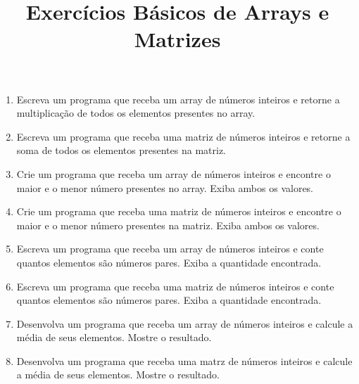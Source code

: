 \documentclass{article}
\title{Exercícios Básicos de Arrays e Matrizes }
\author{}
\date{}
\begin{document}
\maketitle

\begin{enumerate}
    \item Escreva um programa que receba um array de números inteiros e retorne a multiplicação de todos os elementos presentes no array.
    \item Escreva um programa que receba uma matriz de números inteiros e retorne a soma de todos os elementos presentes na matriz.
    \item Crie um programa que receba um array de números inteiros e encontre o maior e o menor número presentes no array. Exiba ambos os valores.
    \item Crie um programa que receba uma matriz de números inteiros e encontre o maior e o menor número presentes na matriz. Exiba ambos os valores.
    \item Escreva um programa que receba um array de números inteiros e conte quantos elementos são números pares. Exiba a quantidade encontrada.
    \item Escreva um programa que receba uma matriz de números inteiros e conte quantos elementos são números pares. Exiba a quantidade encontrada.
    \item Desenvolva um programa que receba um array de números inteiros e calcule a média de seus elementos. Mostre o resultado.
    \item Desenvolva um programa que receba uma matrz de números inteiros e calcule a média de seus elementos. Mostre o resultado.
\end{enumerate}
\end{document}
